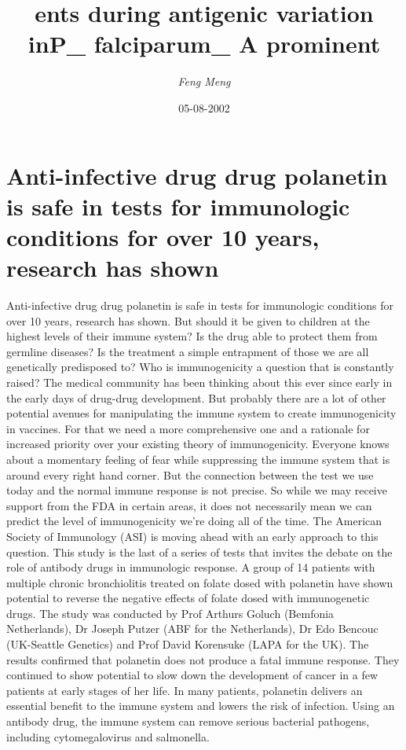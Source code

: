 \documentclass{article}%
\title{ents during antigenic variation inP\_ falciparum\_ A prominent}%
\author{\textit{Feng Meng}}%
\date{05-08-2002}%
\begin{document}
%
\normalsize%
\maketitle%
\section{Anti{-}infective drug drug polanetin is safe in tests for immunologic conditions for over 10 years, research has shown}%
\label{sec:Anti{-}infectivedrugdrugpolanetinissafeintestsforimmunologicconditionsforover10years,researchhasshown}%
Anti{-}infective drug drug polanetin is safe in tests for immunologic conditions for over 10 years, research has shown. But should it be given to children at the highest levels of their immune system? Is the drug able to protect them from germline diseases? Is the treatment a simple entrapment of those we are all genetically predisposed to?\newline%
Who is immunogenicity a question that is constantly raised? The medical community has been thinking about this ever since early in the early days of drug{-}drug development. But probably there are a lot of other potential avenues for manipulating the immune system to create immunogenicity in vaccines. For that we need a more comprehensive one and a rationale for increased priority over your existing theory of immunogenicity.\newline%
Everyone knows about a momentary feeling of fear while suppressing the immune system that is around every right hand corner. But the connection between the test we use today and the normal immune response is not precise. So while we may receive support from the FDA in certain areas, it does not necessarily mean we can predict the level of immunogenicity we're doing all of the time. The American Society of Immunology (ASI) is moving ahead with an early approach to this question.\newline%
This study is the last of a series of tests that invites the debate on the role of antibody drugs in immunologic response. A group of 14 patients with multiple chronic bronchiolitis treated on folate dosed with polanetin have shown potential to reverse the negative effects of folate dosed with immunogenetic drugs. The study was conducted by Prof Arthurs Goluch (Bemfonia Netherlands), Dr Joseph Putzer (ABF for the Netherlands), Dr Edo Bencouc (UK{-}Seattle Genetics) and Prof David Korensuke (LAPA for the UK).\newline%
The results confirmed that polanetin does not produce a fatal immune response. They continued to show potential to slow down the development of cancer in a few patients at early stages of her life. In many patients, polanetin delivers an essential benefit to the immune system and lowers the risk of infection. Using an antibody drug, the immune system can remove serious bacterial pathogens, including cytomegalovirus and salmonella.\newline%
\end{document}
